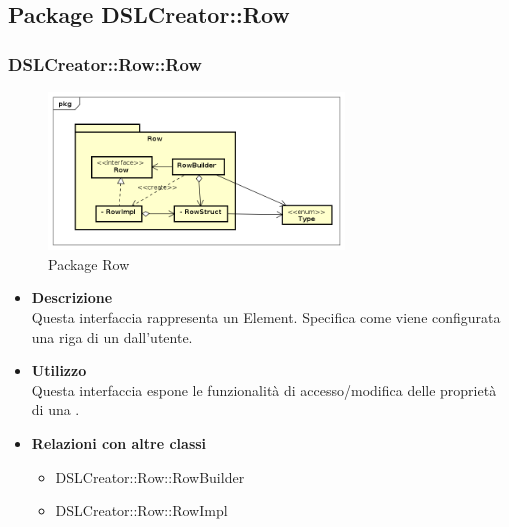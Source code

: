 \subsection{Package DSLCreator::Row}
 \subsubsection{DSLCreator::Row::Row}
                 \begin{figure}[H]
                  \centering
                  \includegraphics[width=0.7\textwidth]{res/img/Row.png}
                  \caption{Package Row}
                  \label{fig:diagram_model}
                \end{figure}
                    \begin{itemize}
                        \item \textbf{Descrizione} \hfill \\
                          Questa interfaccia rappresenta un  Element. Specifica come viene configurata una riga di un  dall'utente.
                        \item \textbf{Utilizzo} \hfill \\
                          Questa interfaccia espone le funzionalità di accesso/modifica delle proprietà di una .
                        \item \textbf{Relazioni con altre classi}
                            \begin{itemize}
                              \item DSLCreator::Row::RowBuilder
                              \item DSLCreator::Row::RowImpl
                            \end{itemize}
                    \end{itemize}

